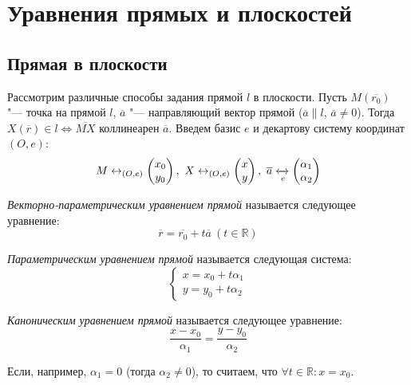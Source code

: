 \section{Уравнения прямых и плоскостей}

\subsection{Прямая в плоскости}
Рассмотрим различные способы задания прямой $l$ в плоскости. Пусть $M (\overline{r_0})$ "--- точка на прямой $l$, $\overline{a}$ "--- направляющий вектор прямой ($\overline{a} \parallel l$, $\overline{a} \ne 0$). Тогда $X (\overline{r}) \in l \Leftrightarrow \overline{MX} \text{ коллинеарен } \overline{a}$. Введем базис $e$ и декартову систему координат $(O, e)$:
\[M \leftrightarrow_{(O, e)}
\begin{pmatrix}
x_0\\y_0
\end{pmatrix},~
X \leftrightarrow_{(O, e)}
\begin{pmatrix}
x\\y
\end{pmatrix},~
\overline{a} \xleftrightarrow[e]{}
\begin{pmatrix}
\alpha_1\\\alpha_2
\end{pmatrix}\]

\begin{definition} \textit{Векторно-параметрическим уравнением прямой} называется следующее уравнение:
	\[\overline{r} = \overline{r_0} + t\overline{a}~(t \in \mathbb{R})\]
\end{definition}

\begin{definition} \textit{Параметрическим уравнением прямой} называется следующая система:
	\[\left\{
	\begin{aligned}
	x = x_0 + t\alpha_1\\
	y = y_0 + t\alpha_2
	\end{aligned}
	\right.
	\]
\end{definition}

\begin{definition}
	\textit{Каноническим уравнением прямой} называется следующее уравнение:
	\[\frac{x - x_0}{\alpha_1} = \frac{y - y_0}{\alpha_2}\]
\end{definition}

\begin{note}
	Если, например, $\alpha_1 = 0$ (тогда $\alpha_2 \ne 0$), то считаем, что $\forall t\in\mathbb{R}: x = x_0$.
\end{note}

